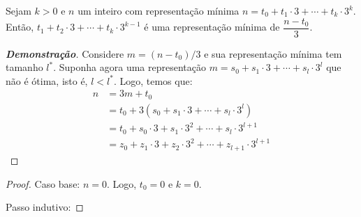\begin{theorem}
    Sejam $k > 0$ e $n$ um inteiro com representação mínima $n = t_0 + t_1 \cdot 3 + \cdots + t_k \cdot 3^k$. Então, $t_1 + t_2 \cdot 3 + \cdots + t_k \cdot 3^{k-1}$ é uma representação mínima de $\dfrac{n - t_0}{3}$.
\end{theorem}

\begin{proof}[\textbf{Demonstração}]
    Considere $m = (n - t_0) / 3$ e sua representação mínima tem tamanho $l^*$. Suponha agora uma representação $m = s_0 + s_1 \cdot 3 + \cdots + s_l \cdot 3^l$ que não é ótima, isto é, $l < l^*$. Logo, temos que:
    \begin{align*}
        n &= 3 m + t_0 \\
        &= t_0 + 3 \left(s_0 + s_1 \cdot 3 + \cdots + s_l \cdot 3^l\right) \\
        &= t_0 + s_0 \cdot 3 + s_1 \cdot 3^2 + \cdots + s_l \cdot 3^{l+1} \\
        &= z_0 + z_1 \cdot 3 + z_2 \cdot 3^2 + \cdots + z_{l + 1} \cdot 3^{l+1}
    \end{align*}
\end{proof}

\begin{proof}
    Caso base: $n = 0$. Logo, $t_0 = 0$ e $k = 0$.

    Passo indutivo:
\end{proof}

